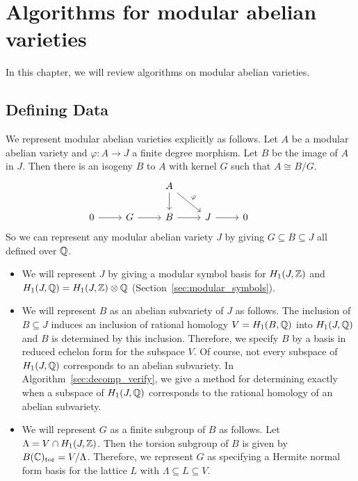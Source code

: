 \chapter{Algorithms for modular abelian varieties}%
\label{chap:algorithms}

In this chapter, we will review algorithms on modular abelian varieties.

\section{Defining Data}%
\label{sec:defining_data}

We represent modular abelian varieties explicitly as follows. Let $A$ be a
modular abelian variety and $\varphi:A\to J$ a finite degree morphism. Let
$B$ be the image of $A$ in $J$. Then there is an isogeny $B$ to $A$ with kernel
$G$ such that $A\cong B/G$.
\begin{equation}
    \label{eq:defining_data}
    \begin{tikzcd}
        &
        &
        A \arrow[d]\arrow[dr,"\varphi"] &
        &
        &
        \\
        0 \arrow[r] &
        G \arrow[r] &
        B \arrow[r] &
        J \arrow[r] &
        0
    \end{tikzcd}
\end{equation}
So we can represent any modular abelian variety $J$ by giving $G\subseteq
B\subseteq J$ all defined over $\mathbb{Q}$.

\begin{itemize}
    \item
        We will represent $J$ by giving a modular
        symbol basis for $H_1(J, \mathbb{Z})$ and $H_1(J, \mathbb{Q}) = H_1(J, \mathbb{Z})\otimes
        \mathbb{Q}$ (Section~\ref{sec:modular_symbols}).
    \item
        We will represent $B$ as an abelian subvariety of $J$ as follows. The
        inclusion of $B\subseteq J$ induces an inclusion of rational homology
        $V=H_1(B, \mathbb{Q})$ into $H_1(J, \mathbb{Q})$ and $B$ is determined by this
        inclusion. Therefore, we specify $B$ by a basis in reduced echelon form
        for the subspace $V$. Of course, not every subspace of $H_1(J, \mathbb{Q})$
        corresponds to an abelian subvariety. In
        Algorithm~\ref{sec:decomp_verify}, we give a method for determining
        exactly when a subspace of $H_1(J, \mathbb{Q})$ corresponds to the rational
        homology of an abelian subvariety.
    \item
        We will represent $G$ as a finite subgroup of $B$ as follows. Let
        $\Lambda=V\cap H_1(J, \mathbb{Z})$. Then the torsion subgroup of $B$ is given
        by $B(\mathbb{C})_{\mathrm{tor}}=V/\Lambda$. Therefore, we represent $G$ as specifying a
        Hermite normal form basis for the lattice $L$ with $\Lambda \subseteq L
        \subseteq V$.
\end{itemize}

